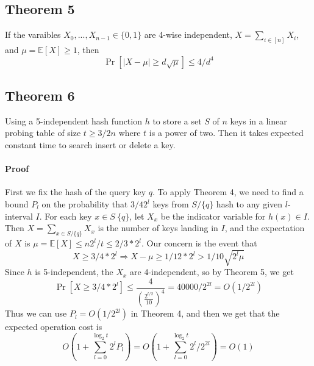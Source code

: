 \documentclass[a4paper, fleqn]{article}
\def\E{\mathbb{E}}
\begin{document}
\subsection{Theorem 5}
If the varaibles $X_0,...,X_{n-1} \in \{0,1\}$ are 4-wise independent, $X = \sum_{i\in [n]} X_i$, and $\mu = \E[X] \geq 1$, then
$$
\Pr[|X-\mu| \geq d\sqrt{\mu}] \leq 4/d^4
$$
\subsection{Theorem 6}
Using a 5-independent hash function $h$ to store a set $S$ of $n$ keys in a linear probing table of size $t \geq 3/2n$ where $t$ is a power of two. Then it takes expected constant time to search insert or delete a key.
\paragraph{Proof}
First we fix the hash of the query key $q$. To apply Theorem 4, we need to find a bound $P_l$ on the probability that $3/4 2^l$ keys from $S/\{q\}$ hash to any given $l$-interval $I$. For each key $x \in S \ \{q\}$, let $X_x$ be the indicator variable for $h(x) \in I$. Then $X = \sum_{x\in S / \{q\}} X_x$ is the number of keys landing in $I$, and the expectation of $X$ is $\mu = \E[X] \leq n2^l/t \leq 2/3* 2^l$. Our concern is the event that
$$
X \geq 3/4* 2^l \Rightarrow X - \mu \geq 1/12 * 2^l > 1/10 \sqrt{2^l\mu}
$$
Since $h$ is 5-independent, the $X_x$ are 4-independent, so by Theorem 5, we get
$$
\Pr [X \geq 3/4* 2^l] \leq \frac{4}{\left(\frac{2^{l/2}}{10}\right)^4} = 40000/2^{2l} = O(1/2^{2l})
$$
Thus we can use $P_l = O(1/2^{2l})$ in Theorem 4, and then we get that the expected operation cost is
$$
O(1+\sum_{l=0}^{\log_2 t}2^lP_l) = O(1+\sum_{l=0}^{\log_2 t}2^l/2^{2l}) = O(1)
$$


\end{document}

